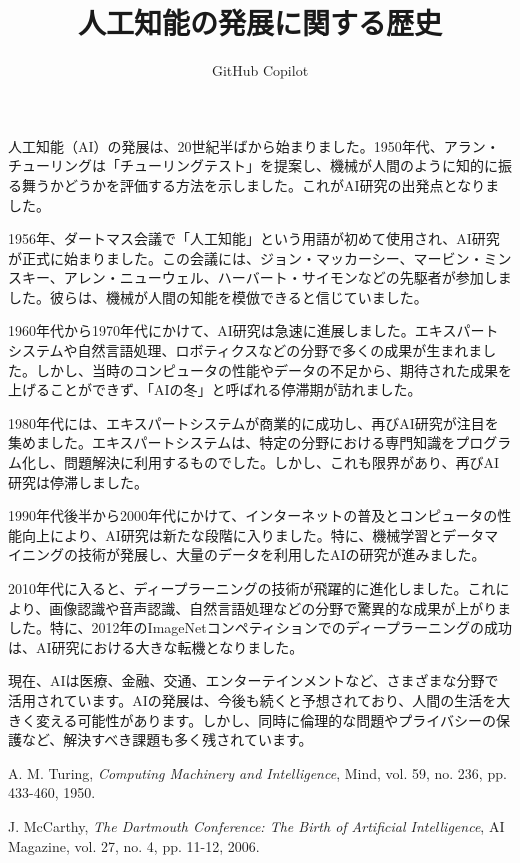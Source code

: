 \documentclass[12pt,twocolumn]{ujarticle}
\title{人工知能の発展に関する歴史}
\author{GitHub Copilot}
\date{}
\begin{document}
\maketitle
\thispagestyle{empty}

人工知能（AI）の発展は、20世紀半ばから始まりました。1950年代、アラン・チューリングは「チューリングテスト」を提案し、機械が人間のように知的に振る舞うかどうかを評価する方法を示しました。これがAI研究の出発点となりました。

1956年、ダートマス会議で「人工知能」という用語が初めて使用され、AI研究が正式に始まりました。この会議には、ジョン・マッカーシー、マービン・ミンスキー、アレン・ニューウェル、ハーバート・サイモンなどの先駆者が参加しました。彼らは、機械が人間の知能を模倣できると信じていました。

1960年代から1970年代にかけて、AI研究は急速に進展しました。エキスパートシステムや自然言語処理、ロボティクスなどの分野で多くの成果が生まれました。しかし、当時のコンピュータの性能やデータの不足から、期待された成果を上げることができず、「AIの冬」と呼ばれる停滞期が訪れました。

1980年代には、エキスパートシステムが商業的に成功し、再びAI研究が注目を集めました。エキスパートシステムは、特定の分野における専門知識をプログラム化し、問題解決に利用するものでした。しかし、これも限界があり、再びAI研究は停滞しました。

1990年代後半から2000年代にかけて、インターネットの普及とコンピュータの性能向上により、AI研究は新たな段階に入りました。特に、機械学習とデータマイニングの技術が発展し、大量のデータを利用したAIの研究が進みました。

2010年代に入ると、ディープラーニングの技術が飛躍的に進化しました。これにより、画像認識や音声認識、自然言語処理などの分野で驚異的な成果が上がりました。特に、2012年のImageNetコンペティションでのディープラーニングの成功は、AI研究における大きな転機となりました。

現在、AIは医療、金融、交通、エンターテインメントなど、さまざまな分野で活用されています。AIの発展は、今後も続くと予想されており、人間の生活を大きく変える可能性があります。しかし、同時に倫理的な問題やプライバシーの保護など、解決すべき課題も多く残されています。

\begin{thebibliography}{9}

A. M. Turing,
\textit{Computing Machinery and Intelligence},
Mind, vol. 59, no. 236, pp. 433-460, 1950.

J. McCarthy,
\textit{The Dartmouth Conference: The Birth of Artificial Intelligence},
AI Magazine, vol. 27, no. 4, pp. 11-12, 2006.

\end{thebibliography}
\end{document}
